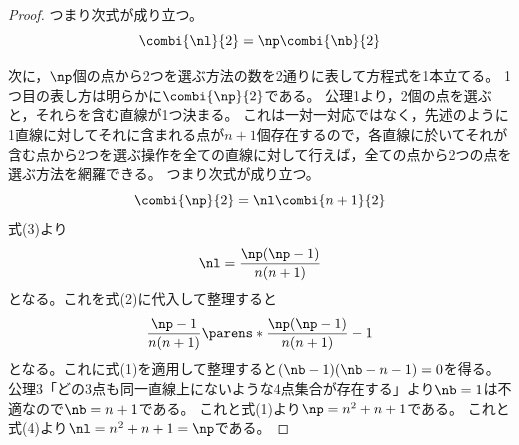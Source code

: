 \begin{proof}
                つまり次式が成り立つ。
                \begin{equation}
                    \combi{\nl}{2} = \np\combi{\nb}{2}
                \end{equation}
                \par
                次に，$\np$個の点から2つを選ぶ方法の数を2通りに表して方程式を1本立てる。
                1つ目の表し方は明らかに$\combi{\np}{2}$である。
                公理1より，2個の点を選ぶと，それらを含む直線が1つ決まる。
                これは一対一対応ではなく，先述のように1直線に対してそれに含まれる点が$n+1$個存在するので，各直線に於いてそれが含む点から2つを選ぶ操作を全ての直線に対して行えば，全ての点から2つの点を選ぶ方法を網羅できる。
                つまり次式が成り立つ。
                \begin{equation}
                    \combi{\np}{2} = \nl\combi{n+1}{2}
                \end{equation}
                式(3)より
                \begin{equation}
                    \nl = \frac{\np(\np-1)}{n(n+1)}
                \end{equation}
                となる。これを式(2)に代入して整理すると
                \[ \frac{\np-1}{n(n+1)}\parens*{\frac{\np(\np-1)}{n(n+1)} - 1} \]
                となる。これに式(1)を適用して整理すると$(\nb-1)(\nb-n-1) = 0$を得る。
                公理3「どの3点も同一直線上にないような4点集合が存在する」より$\nb=1$は不適なので$\nb=n+1$である。
                これと式(1)より$\np = n^2+n+1$である。
                これと式(4)より$\nl = n^2+n+1 = \np$である。
            \end{proof}